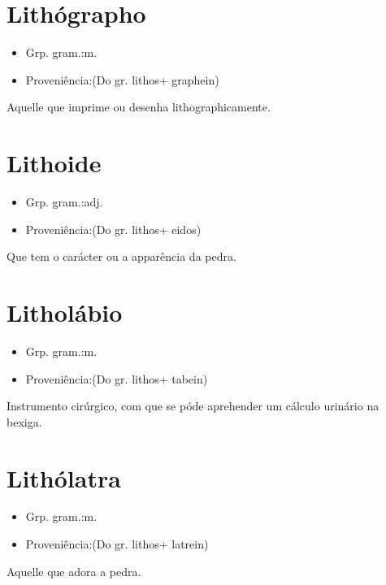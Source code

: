 \section{Lithógrapho}
\begin{itemize}
\item {Grp. gram.:m.}
\end{itemize}
\begin{itemize}
\item {Proveniência:(Do gr. \textunderscore lithos\textunderscore  + \textunderscore graphein\textunderscore )}
\end{itemize}
Aquelle que imprime ou desenha lithographicamente.
\section{Lithoide}
\begin{itemize}
\item {Grp. gram.:adj.}
\end{itemize}
\begin{itemize}
\item {Proveniência:(Do gr. \textunderscore lithos\textunderscore  + \textunderscore eidos\textunderscore )}
\end{itemize}
Que tem o carácter ou a apparência da pedra.
\section{Litholábio}
\begin{itemize}
\item {Grp. gram.:m.}
\end{itemize}
\begin{itemize}
\item {Proveniência:(Do gr. \textunderscore lithos\textunderscore  + \textunderscore tabein\textunderscore )}
\end{itemize}
Instrumento cirúrgico, com que se póde aprehender um cálculo urinário na bexiga.
\section{Lithólatra}
\begin{itemize}
\item {Grp. gram.:m.}
\end{itemize}
\begin{itemize}
\item {Proveniência:(Do gr. \textunderscore lithos\textunderscore  + \textunderscore latrein\textunderscore )}
\end{itemize}
Aquelle que adora a pedra.

